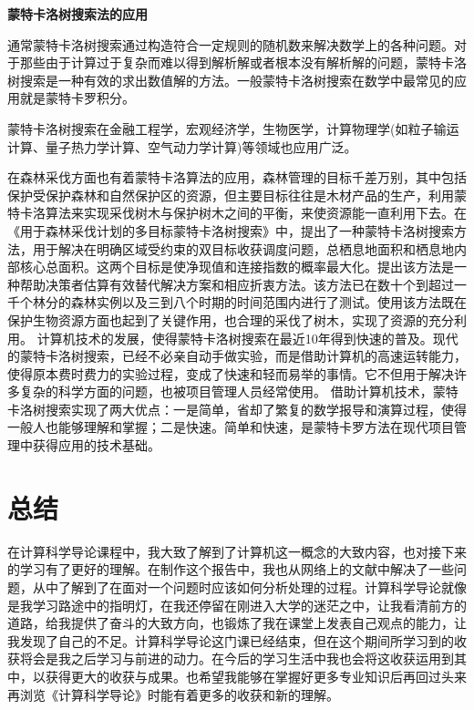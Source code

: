 \documentclass{article}
\begin{document}
{\bf  蒙特卡洛树搜索法的应用}\par
通常蒙特卡洛树搜索通过构造符合一定规则的随机数来解决数学上的各种问题。对于那些由于计算过于复杂而难以得到解析解或者根本没有解析解的问题，蒙特卡洛树搜索是一种有效的求出数值解的方法。一般蒙特卡洛树搜索在数学中最常见的应用就是蒙特卡罗积分。\par
蒙特卡洛树搜索在金融工程学，宏观经济学，生物医学，计算物理学(如粒子输运计算、量子热力学计算、空气动力学计算)等领域也应用广泛。\par
在森林采伐方面也有着蒙特卡洛算法的应用，森林管理的目标千差万别，其中包括保护受保护森林和自然保护区的资源，但主要目标往往是木材产品的生产，利用蒙特卡洛算法来实现采伐树木与保护树木之间的平衡，来使资源能一直利用下去。在《用于森林采伐计划的多目标蒙特卡洛树搜索》中\citep{TeresaNeto}，提出了一种蒙特卡洛树搜索方法，用于解决在明确区域受约束的双目标收获调度问题，总栖息地面积和栖息地内部核心总面积。这两个目标是使净现值和连接指数的概率最大化。提出该方法是一种帮助决策者估算有效替代解决方案和相应折衷方法。该方法已在数十个到超过一千个林分的森林实例以及三到八个时期的时间范围内进行了测试。使用该方法既在保护生物资源方面也起到了关键作用，也合理的采伐了树木，实现了资源的充分利用。
计算机技术的发展，使得蒙特卡洛树搜索在最近10年得到快速的普及。现代的蒙特卡洛树搜索，已经不必亲自动手做实验，而是借助计算机的高速运转能力，使得原本费时费力的实验过程，变成了快速和轻而易举的事情。它不但用于解决许多复杂的科学方面的问题，也被项目管理人员经常使用。
借助计算机技术，蒙特卡洛树搜索实现了两大优点：一是简单，省却了繁复的数学报导和演算过程，使得一般人也能够理解和掌握；二是快速。简单和快速，是蒙特卡罗方法在现代项目管理中获得应用的技术基础。

\section{总结}
在计算科学导论课程中，我大致了解到了计算机这一概念的大致内容，也对接下来的学习有了更好的理解。在制作这个报告中，我也从网络上的文献中解决了一些问题，从中了解到了在面对一个问题时应该如何分析处理的过程。计算科学导论就像是我学习路途中的指明灯，在我还停留在刚进入大学的迷茫之中，让我看清前方的道路，给我提供了奋斗的大致方向，也锻炼了我在课堂上发表自己观点的能力，让我发现了自己的不足。计算科学导论这门课已经结束，但在这个期间所学习到的收获将会是我之后学习与前进的动力。在今后的学习生活中我也会将这收获运用到其中，以获得更大的收获与成果。也希望我能够在掌握好更多专业知识后再回过头来再浏览《计算科学导论》时能有着更多的收获和新的理解。

\section{}


\end{document}
